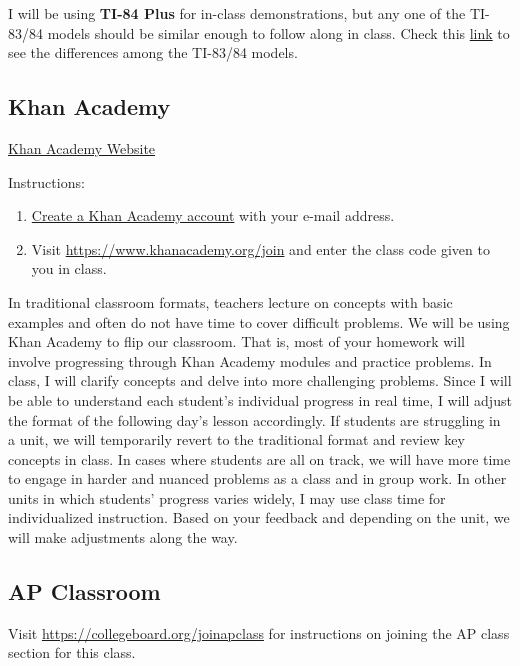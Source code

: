 \documentclass[12pt,fleqn]{article}
\begin{document}
I will be using \textbf{TI-84 Plus} for in-class demonstrations, but any one of the TI-83/84 models should be similar enough to follow along in class. Check this \href{https://brownmath.com/ti83/diff8384.htm\#PlusSilver}{link} to see the differences among the TI-83/84 models.

\hypertarget{khan}{%
\subsection{Khan Academy}\label{khan}}

\href{https://www.khanacademy.org/}{Khan Academy Website}

Instructions:

\begin{enumerate}
\def\labelenumi{\arabic{enumi}.}
\item
  \href{https://www.khanacademy.org/signup}{Create a Khan Academy account} with your e-mail address.
\item
  Visit \url{https://www.khanacademy.org/join} and enter the class code given to you in class.
\end{enumerate}

In traditional classroom formats, teachers lecture on concepts with basic examples and often do not have time to cover difficult problems. We will be using Khan Academy to flip our classroom. That is, most of your homework will involve progressing through Khan Academy modules and practice problems. In class, I will clarify concepts and delve into more challenging problems. Since I will be able to understand each student's individual progress in real time, I will adjust the format of the following day's lesson accordingly. If students are struggling in a unit, we will temporarily revert to the traditional format and review key concepts in class. In cases where students are all on track, we will have more time to engage in harder and nuanced problems as a class and in group work. In other units in which students' progress varies widely, I may use class time for individualized instruction. Based on your feedback and depending on the unit, we will make adjustments along the way.

\hypertarget{ap-classroom}{%
\subsection{AP Classroom}\label{ap-classroom}}

Visit \url{https://collegeboard.org/joinapclass} for instructions on joining the AP class section for this class.
\end{document}
